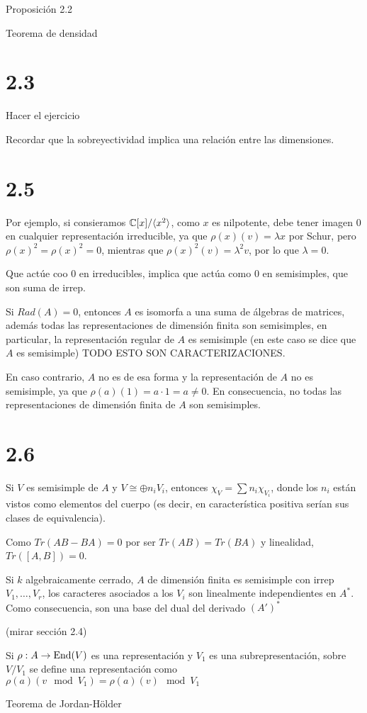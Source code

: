\documentclass[ANAyTR.tex]{subfiles}
\begin{document}
Proposición 2.2

Teorema de densidad

\section{2.3}

Hacer el ejercicio

Recordar que la sobreyectividad implica una relación entre las dimensiones.


\section{2.5}
Por ejemplo, si consieramos $\mathbb{C}[x]/\langle{x^2}\rangle$, como $x$ es nilpotente, debe tener imagen 0 en cualquier representación irreducible, ya que $\rho(x)(v)=\lambda x$ por Schur, pero $\rho(x)^2=\rho(x)^2=0$, mientras que $\rho(x)^2(v)=\lambda^2 v$, por lo que $\lambda=0$. 

Que actúe coo 0 en irreducibles, implica que actúa como 0 en semisimples, que son suma de irrep.

Si $Rad(A)=0$, entonces $A$ es isomorfa a una suma de álgebras de matrices, además todas las representaciones de dimensión finita son semisimples, en particular, la representación regular de $A$ es semisimple (en este caso se dice que $A$ es semisimple) TODO ESTO SON CARACTERIZACIONES.

 En caso contrario, $A$ no es de esa forma y la representación de $A$ no es semisimple, ya que $\rho(a)(1)=a\cdot 1=a\neq 0$. En consecuencia, no todas las representaciones de dimensión finita de $A$ son semisimples.
 
 \section{2.6}
 
 Si $V$ es semisimple de $A$ y $V\cong\oplus n_i V_i$, entonces $\chi_V=\sum n_i\chi_{V_i}$, donde los $n_i$ están vistos como elementos del cuerpo (es decir, en característica positiva serían sus clases de equivalencia). 
 
 
 Como $Tr(AB-BA)=0$ por ser $Tr(AB)=Tr(BA)$ y linealidad, $Tr([A,B])=0$. 
 
 Si $k$ algebraicamente cerrado, $A$ de dimensión finita es semisimple con irrep $V_1,\dots, V_r$, los caracteres asociados a los $V_i$ son linealmente independientes en $A^*$. Como consecuencia, son una base del dual del derivado $(A')^*$
 
 (mirar sección 2.4)
 
 Si $\rho:A\to\operatorname{End}(V)$ es una representación y $V_1$ es una subrepresentación, sobre $V/V_1$ se define una representación como $\rho(a)(v\mod V_1)=\rho(a)(v)\mod V_1$
 
 Teorema de Jordan-Hölder
\end{document}
